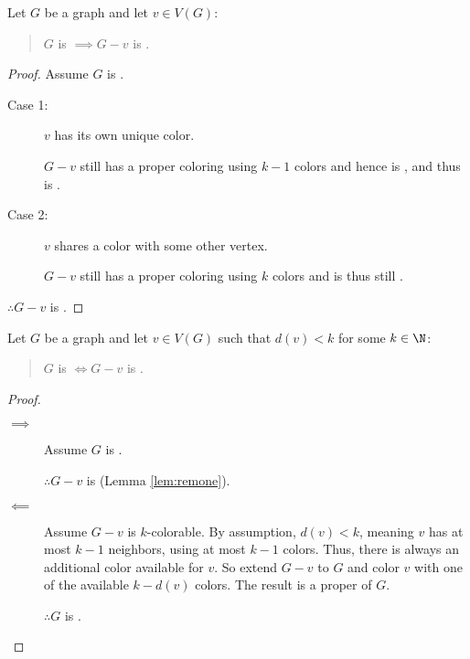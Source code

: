 \begin{lemma}
  \label{lem:remone}
  Let \(G\) be a graph and let \(v\in V(G)\):
  \begin{quote}
    \(G\) is  \(\implies G-v\) is .
  \end{quote}
\end{lemma}

\begin{proof}
  
  Assume \(G\) is .

  \begin{description}
  \item[Case 1:] \(v\) has its own unique color.
      
    \(G-v\) still has a proper coloring using \(k-1\) colors and hence is , and thus is .

  \item[Case 2:] \(v\) shares a color with some other vertex.

    \(G-v\) still has a proper coloring using \(k\) colors and is thus still .
  \end{description}

  \(\therefore G-v\) is .
\end{proof}

\begin{lemma}
  \label{lem:lowdeg}
  Let \(G\) be a graph and let \(v\in V(G)\) such that \(d(v)<k\) for some \(k\in\N\):
  \begin{quote}
    \(G\) is  \(\iff G-v\) is .
  \end{quote}
\end{lemma}

\begin{proof}
  \begin{description}
  \item[]
  \item[\(\implies\)] Assume \(G\) is .

    \(\therefore G-v\) is  (Lemma \ref{lem:remone}).

  \item[\(\impliedby\)] Assume \(G-v\) is \(k\)-colorable.
    By assumption, \(d(v)<k\), meaning \(v\) has at most \(k-1\) neighbors, using at most \(k-1\) colors.  Thus, there is
    always an additional color available for \(v\).  So extend \(G-v\) to \(G\) and color \(v\) with one of the available
    \(k-d(v)\) colors.  The result is a proper  of \(G\).

    \(\therefore G\) is .
  \end{description}
\end{proof}


